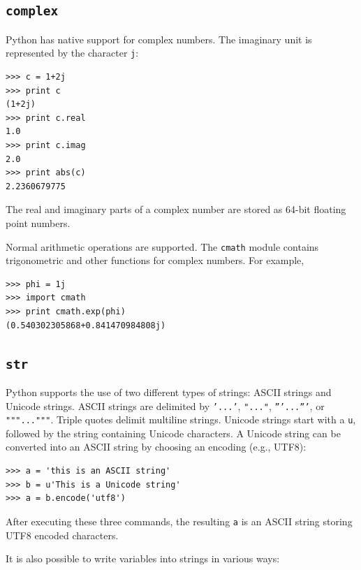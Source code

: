 \documentclass[justified,sixbynine]{tufte-book}
\def\ft{\small\tt}
\theoremstyle{plain}%
\theoremstyle{definition}
\theoremstyle{remark}
\begin{document}
\begin{fullwidth}
\goodbreak\subsection{{\ft complex}}


Python has native support for complex numbers. The imaginary unit is represented by the character {\ft j}:

\begin{lstlisting}
>>> c = 1+2j
>>> print c
(1+2j)
>>> print c.real
1.0
>>> print c.imag
2.0
>>> print abs(c)
2.2360679775
\end{lstlisting}

The real and imaginary parts of a complex number are stored as 64-bit floating point numbers.

Normal arithmetic operations are supported. The {\ft cmath} module contains trigonometric and other functions for complex numbers. For example,

\begin{lstlisting}
>>> phi = 1j
>>> import cmath
>>> print cmath.exp(phi)
(0.540302305868+0.841470984808j)
\end{lstlisting}


\goodbreak\subsection{{\ft str}}

    

Python supports the use of two different types of strings: ASCII strings and Unicode strings. ASCII strings are delimited by {\ft '...'}, {\ft "..."}, {\ft '''...'''}, or {\ft """..."""}. Triple quotes delimit multiline strings. Unicode strings start with a {\ft u}, followed by the string containing Unicode characters. A Unicode string can be converted into an ASCII string by choosing an encoding (e.g., UTF8):

\begin{lstlisting}
>>> a = 'this is an ASCII string'
>>> b = u'This is a Unicode string'
>>> a = b.encode('utf8')
\end{lstlisting}

After executing these three commands, the resulting {\ft a} is an ASCII string storing UTF8 encoded characters.

It is also possible to write variables into strings in various ways:


\end{fullwidth}
\end{document}
